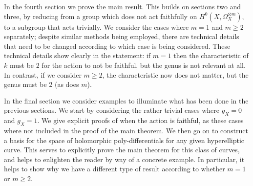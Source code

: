 In the fourth section we prove the main result.
This builds on sections two and three, by reducing from a group which does not act faithfully on $H^0(X,\Omega_X^{\otimes m})$, to a subgroup that acts trivially.
We consider the cases where $m=1$ and $m\geq 2$ separately; despite similar methods being employed, there are technical details that need to be changed according to which case is being considered.
These technical details show clearly in the statement: if $m=1$ then the characteristic of $k$ must be 2 for the action to not be faithful, but the genus is not relevant at all.
In contrast, if we consider $m\geq 2$, the characteristic now does not matter, but the genus must be 2 (as does $m$).

In the final section we consider examples to illuminate what has been done in the previous sections.
We start by considering the rather trivial cases where $g_X=0$ and $g_X= 1$.
We give explicit proofs of when the action is faithful, as these cases where not included in the proof of the main theorem.
We then go on to construct a basis for the space of holomorphic poly-differentials for any given hyperelliptic curve.
This serves to explicitly prove the main theorem for this class of curves, and helps to enlighten the reader by way of a concrete example.
In particular, it helps to show why we have a different type of result according to whether $m=1$ or $m\geq 2$.
